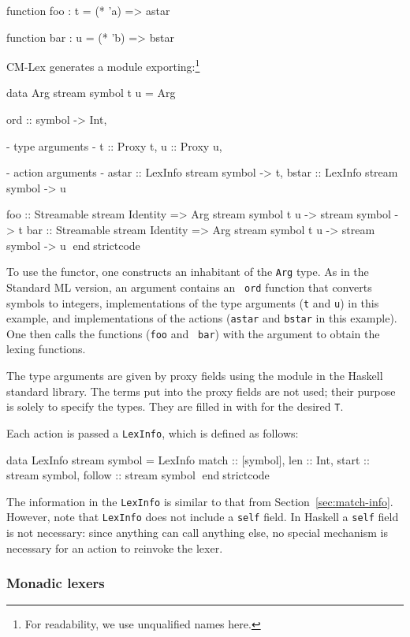 \documentclass[10pt]{article}
\begin{document}
\begin{strictcode}
\begin{strictcode}
\begin{strictcode}
\begin{strictcode}
\begin{code}
function foo : t =
  (* 'a) => astar

function bar : u =
  (* 'b) => bstar
\end{code}


CM-Lex generates a module exporting:\footnote{For readability, we
use unqualified names here.}


\begin{strictcode}
data Arg stream symbol t u =
   Arg { ord :: symbol -> Int,

         {- type arguments -}
         t :: Proxy t,
         u :: Proxy u,

         {- action arguments -}
         astar :: LexInfo stream symbol -> t,
         bstar :: LexInfo stream symbol -> u }

foo :: Streamable stream Identity
       => Arg stream symbol t u -> stream symbol -> t
bar :: Streamable stream Identity
       => Arg stream symbol t u -> stream symbol -> u
endstrictcode


To use the functor, one constructs an inhabitant of the {\tt Arg}
type.  As in the Standard ML version, an argument contains an {\tt
ord} function that converts symbols to integers, implementations of
the type arguments ({\tt t} and {\tt u}) in this example, and
implementations of the actions ({\tt astar} and {\tt bstar} in this
example).  One then calls the functions ({\tt foo} and {\tt
bar}) with the argument to obtain the lexing functions.

The type arguments are given by proxy fields using the
 module in the Haskell standard library.  The terms put into the
proxy fields are not used; their purpose is solely to specify the
types.  They are filled in with  for
the desired {\tt T}.

Each action is passed a {\tt LexInfo}, which is defined as follows:

\begin{strictcode}
data LexInfo stream symbol =
   LexInfo
   { match :: [symbol],
     len :: Int,
     start :: stream symbol,
     follow :: stream symbol }
endstrictcode

The information in the {\tt LexInfo} is similar to that from
Section~\ref{sec:match-info}.  However, note that {\tt LexInfo} does
not include a {\tt self} field.  In Haskell a {\tt self} field is not
necessary: since anything can call anything else, no special mechanism
is necessary for an action to reinvoke the lexer.


\subsubsection{Monadic lexers}


\end{strictcode}
\end{strictcode}
\end{strictcode}
\end{strictcode}
\end{strictcode}
\end{strictcode}
\end{document}
